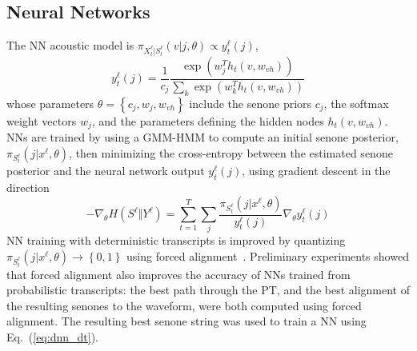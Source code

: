 \subsection{Neural Networks}

The NN acoustic model is $\pi_{X_t^{\ell}|S_t^\ell}(v|j,\theta)\propto y_t^\ell(j)$,
\begin{equation}
y_t^\ell(j)=\frac{1}{c_j}\frac{\exp\left(w_j^Th_t(v,w_{vh})\right)}
{\sum_k \exp\left(w_k^Th_t(v,w_{vh})\right)}
\end{equation}
whose parameters $\theta=\left\{c_j,w_j,w_{vh}\right\}$ include the
senone priors $c_j$, the softmax weight vectors $w_j$, and the
parameters defining the hidden nodes $h_t(v,w_{vh})$.  NNs are
trained by using a GMM-HMM to compute an initial senone posterior,
$\pi_{S_t^{\ell}}(j|x^\ell,\theta)$, then minimizing the cross-entropy
between the estimated senone posterior and the neural network output
$y_{t}^\ell(j)$,
using gradient descent in the direction
\begin{equation}
  -\nabla_\theta H(S^\ell\Vert Y^\ell)=
  \sum_{t=1}^T\sum_j\frac{\pi_{S_t^{\ell}}(j|x^\ell,\theta)}{y_t^\ell(j)}
  \nabla_\theta y_t^\ell(j)
  \label{eq:dnn_dt}
\end{equation}
NN training with deterministic transcripts is improved by
quantizing $\pi_{S_t^\ell}(j|x^\ell,\theta)\rightarrow\left\{0,1\right\}$
using forced alignment~\cite{Dahl2012}. Preliminary experiments showed
that forced alignment also improves the accuracy of NNs trained from
probabilistic transcripts: the best path through the PT, and the
best alignment of the resulting senones to the waveform, were both
computed using forced alignment.  The resulting best senone string was
used to train a NN using Eq.~(\ref{eq:dnn_dt}).

